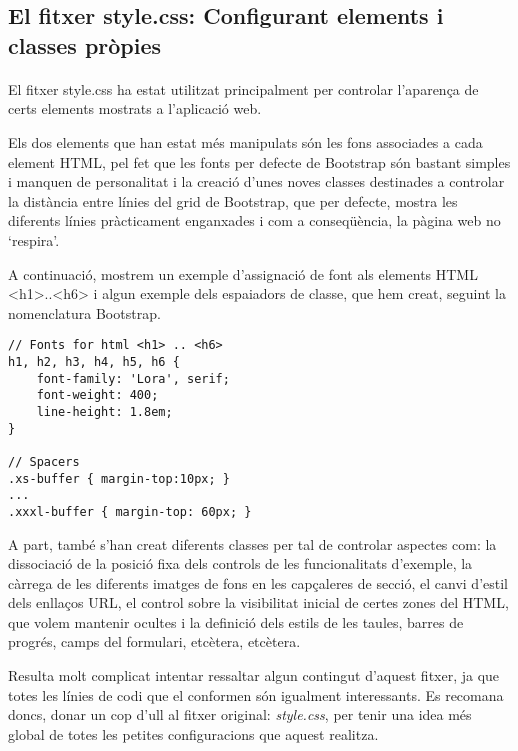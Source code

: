 \subsection{El fitxer style.css: Configurant elements i classes pròpies}

    \paragraph{}
    El fitxer style.css ha estat utilitzat principalment per controlar l'aparença de certs elements mostrats a l'aplicació web.

    Els dos elements que han estat més manipulats són les fons associades a cada element HTML, pel fet que les fonts per defecte de Bootstrap són bastant simples i manquen de personalitat i la creació d'unes noves classes destinades a controlar la distància entre línies del grid de Bootstrap, que per defecte, mostra les diferents línies pràcticament enganxades i com a conseqüència, la pàgina web no `respira'.

    A continuació, mostrem un exemple d'assignació de font als elements HTML <h1>..<h6> i algun exemple dels espaiadors de classe, que hem creat, seguint la nomenclatura Bootstrap.

    \begin{lstlisting}[style=rawOwn,caption={Assignant fonts a elements HTML i creació d'espaiadors}]
// Fonts for html <h1> .. <h6>
h1, h2, h3, h4, h5, h6 {
    font-family: 'Lora', serif;
    font-weight: 400;
    line-height: 1.8em;
}

// Spacers
.xs-buffer { margin-top:10px; }
...
.xxxl-buffer { margin-top: 60px; }
    \end{lstlisting}

    A part, també s'han creat diferents classes per tal de controlar aspectes com: la dissociació de la posició fixa dels controls de les funcionalitats d'exemple, la càrrega de les diferents imatges de fons en les capçaleres de secció, el canvi d'estil dels enllaços URL, el control sobre la visibilitat inicial de certes zones del HTML, que volem mantenir ocultes i la definició dels estils de les taules, barres de progrés, camps del formulari, etcètera, etcètera.

    Resulta molt complicat intentar ressaltar algun contingut d'aquest fitxer, ja que totes les línies de codi que el conformen són igualment interessants. Es recomana doncs, donar un cop d'ull al fitxer original: \emph{style.css}, per tenir una idea més global de totes les petites configuracions que aquest realitza.
